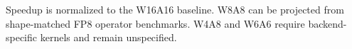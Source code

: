 
\begin{table}[t]
\centering
\caption{Projected end-to-end inference speedup under different quantization configurations.}
\label{tab:inference_speedup}

\vspace{0.4em}
\begin{minipage}{0.86\textwidth}
\footnotesize
Speedup is normalized to the W16A16 baseline.
W8A8 can be projected from shape-matched FP8 operator benchmarks.
W4A8 and W6A6 require backend-specific kernels and remain unspecified.
\end{minipage}
\end{table}
